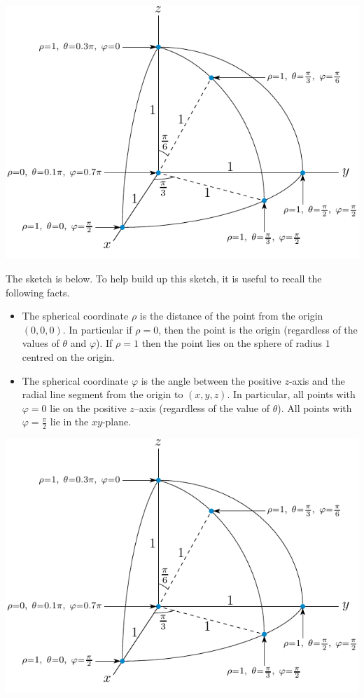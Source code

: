 \begin{answer}
\begin{center}
   \includegraphics{fig/sphericalP1.pdf}
\end{center}
\end{answer}

\begin{solution}
The sketch is below. To help build up this sketch, it is useful to 
recall the following facts.
\begin{itemize}
\item
The spherical coordinate $\rho$ is the distance of the point from the 
origin $(0,0,0)$.
In particular if $\rho=0$, then the point is the origin (regardless of the values of $\theta$ and $\varphi$). If $\rho=1$ then the point lies on the 
sphere of radius $1$ centred on the origin.
\item
The spherical coordinate $\varphi$ is the angle between the positive $z$-axis 
and the radial line segment from the origin to $(x,y,z)$.
In particular, all points with $\varphi=0$ lie on the positive $z$--axis
(regardless of the value of $\theta$). All points with $\varphi=\frac{\pi}{2}$
lie in the $xy$-plane.
\end{itemize}
\begin{center}
   \includegraphics{fig/sphericalP1.pdf}
\end{center}
\end{solution}

